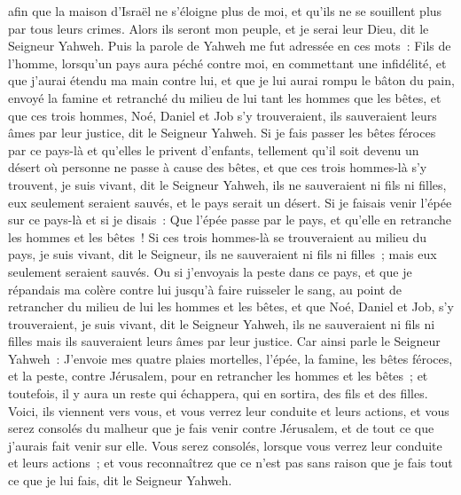 \begin{multicols}{2}
afin que la maison d'Israël ne s'éloigne plus de moi, et qu'ils ne se souillent plus par tous leurs crimes. Alors ils seront mon peuple, et je serai leur Dieu, dit le Seigneur Yahweh.
Puis la parole de Yahweh me fut adressée en ces mots~:
Fils de l'homme, lorsqu'un pays aura péché contre moi, en commettant une infidélité, et que j'aurai étendu ma main contre lui, et que je lui aurai rompu le bâton du pain, envoyé la famine et retranché du milieu de lui tant les hommes que les bêtes,
et que ces trois hommes, Noé, Daniel et Job s'y trouveraient, ils sauveraient leurs âmes par leur justice, dit le Seigneur Yahweh.
Si je fais passer les bêtes féroces par ce pays-là et qu'elles le privent d'enfants, tellement qu'il soit devenu un désert où personne ne passe à cause des bêtes,
et que ces trois hommes-là s'y trouvent, je suis vivant, dit le Seigneur Yahweh, ils ne sauveraient ni fils ni filles, eux seulement seraient sauvés, et le pays serait un désert.
Si je faisais venir l'épée sur ce pays-là et si je disais~: Que l'épée passe par le pays, et qu'elle en retranche les hommes et les bêtes~!
Si ces trois hommes-là se trouveraient au milieu du pays, je suis vivant, dit le Seigneur, ils ne sauveraient ni fils ni filles~; mais eux seulement seraient sauvés.
Ou si j'envoyais la peste dans ce pays, et que je répandais ma colère contre lui jusqu'à faire ruisseler le sang, au point de retrancher du milieu de lui les hommes et les bêtes,
et que Noé, Daniel et Job, s'y trouveraient, je suis vivant, dit le Seigneur Yahweh, ils ne sauveraient ni fils ni filles mais ils sauveraient leurs âmes par leur justice.
Car ainsi parle le Seigneur Yahweh~: J'envoie mes quatre plaies mortelles, l'épée, la famine, les bêtes féroces, et la peste, contre Jérusalem, pour en retrancher les hommes et les bêtes~;
et toutefois, il y aura un reste qui échappera, qui en sortira, des fils et des filles. Voici, ils viennent vers vous, et vous verrez leur conduite et leurs actions, et vous serez consolés du malheur que je fais venir contre Jérusalem, et de tout ce que j'aurais fait venir sur elle.
Vous serez consolés, lorsque vous verrez leur conduite et leurs actions~; et vous reconnaîtrez que ce n'est pas sans raison que je fais tout ce que je lui fais, dit le Seigneur Yahweh.

\end{multicols}
